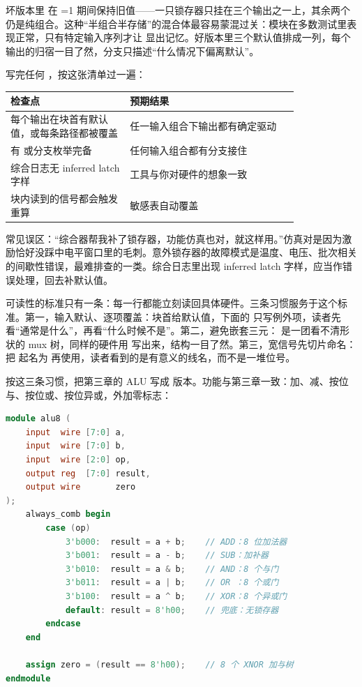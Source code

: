 坏版本里  在 =1 期间保持旧值——一只锁存器只挂在三个输出之一上，其余两个仍是纯组合。这种“半组合半存储”的混合体最容易蒙混过关：模块在多数测试里表现正常，只有特定输入序列才让  显出记忆。好版本里三个默认值排成一列，每个输出的归宿一目了然，分支只描述“什么情况下偏离默认”。

写完任何 ，按这张清单过一遍：

\begin{longtable}{L{0.34\linewidth}L{0.48\linewidth}}
\toprule
检查点 & 预期结果 \\
\midrule
每个输出在块首有默认值，或每条路径都被覆盖 & 任一输入组合下输出都有确定驱动 \\
 有  或分支枚举完备 & 任何输入组合都有分支接住 \\
综合日志无 inferred latch 字样 & 工具与你对硬件的想象一致 \\
块内读到的信号都会触发重算 &  敏感表自动覆盖 \\
\bottomrule
\end{longtable}

\begin{warningbox}
常见误区：“综合器帮我补了锁存器，功能仿真也对，就这样用。”仿真对是因为激励恰好没踩中电平窗口里的毛刺。意外锁存器的故障模式是温度、电压、批次相关的间歇性错误，最难排查的一类。综合日志里出现 inferred latch 字样，应当作错误处理，回去补默认值。
\end{warningbox}

可读性的标准只有一条：每一行都能立刻读回具体硬件。三条习惯服务于这个标准。第一，输入默认、逐项覆盖：块首给默认值，下面的  只写例外项，读者先看“通常是什么”，再看“什么时候不是”。第二，避免嵌套三元： 是一团看不清形状的 mux 树，同样的硬件用  写出来，结构一目了然。第三，宽信号先切片命名：把  起名为  再使用，读者看到的是有意义的线名，而不是一堆位号。

按这三条习惯，把第三章的 ALU 写成  版本。功能与第三章一致：加、减、按位与、按位或、按位异或，外加零标志：

\begin{lstlisting}[language=Verilog]
module alu8 (
    input  wire [7:0] a,
    input  wire [7:0] b,
    input  wire [2:0] op,
    output reg  [7:0] result,
    output wire       zero
);
    always_comb begin
        case (op)
            3'b000:  result = a + b;    // ADD：8 位加法器
            3'b001:  result = a - b;    // SUB：加补器
            3'b010:  result = a & b;    // AND：8 个与门
            3'b011:  result = a | b;    // OR ：8 个或门
            3'b100:  result = a ^ b;    // XOR：8 个异或门
            default: result = 8'h00;    // 兜底：无锁存器
        endcase
    end

    assign zero = (result == 8'h00);    // 8 个 XNOR 加与树
endmodule
\end{lstlisting}

